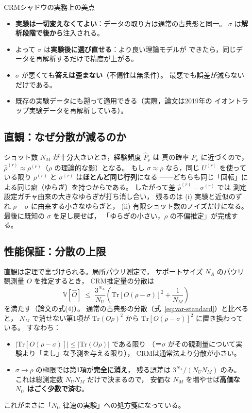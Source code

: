 \documentclass[11pt]{ltjsarticle}
\newcommand{\Tr}{\mathrm{Tr}}
\newcommand{\Var}{\mathbb{V}}
\newcommand{\NU}{N_U}
\newcommand{\NM}{N_M}
\begin{document}
\begin{pointbox}{CRMシャドウの実務上の美点}
\begin{itemize}
  \item \textbf{実験は一切変えなくてよい}：データの取り方は通常の古典影と同一。
        $\sigma$ は\textbf{解析段階で後から}注入される。
  \item よって $\sigma$ は\textbf{実験後に選び直せる}：より良い理論モデルが
        できたら，同じデータを再解析するだけで精度が上がる。
  \item $\sigma$ が悪くても\textbf{答えは歪まない}（不偏性は無条件）。
        最悪でも誤差が減らないだけである。
  \item 既存の実験データにも遡って適用できる（実際，論文は2019年の
        イオントラップ実験データを再解析している）。
\end{itemize}
\end{pointbox}

\subsection{直観：なぜ分散が減るのか}

ショット数 $\NM$ が十分大きいとき，経験頻度 $\hat P_\rho$ は
真の確率 $P_\rho$ に近づくので，
$\hat\rho^{(r)} \approx \rho^{(r)}$（$\rho$ の理論的な影）となる。
もし $\sigma \approx \rho$ なら，同じ $U^{(r)}$ を使っている限り
$\rho^{(r)}$ と $\sigma^{(r)}$ は\textbf{ほとんど同じ行列}になる
――どちらも同じ「回転」による同じ癖（ゆらぎ）を持つからである。
したがって差 $\hat\rho^{(r)} - \sigma^{(r)}$ では
測定設定ガチャ由来の大きなゆらぎが打ち消し合い，
残るのは (i) 実験と近似のずれ $\rho - \sigma$ に由来する小さなゆらぎと，
(ii) 有限ショット数のノイズだけになる。
最後に既知の $\sigma$ を足し戻せば，
「ゆらぎの小さい，$\rho$ の不偏推定」が完成する。

\subsection{性能保証：分散の上限}

直観は定理で裏づけられる。局所パウリ測定で，
サポートサイズ $N_A$ のパウリ観測量 $O$ を推定するとき，
CRM推定量の分散は
\begin{equation}
  \Var[\hat O] \;\leq\; \frac{3^{N_A}}{\NU}
  \left( \Tr\!\left[O(\rho - \sigma)\right]^2 + \frac{1}{\NM} \right)
  \label{eq:var-crm}
\end{equation}
を満たす（論文の式(4)）。
通常の古典影の分散（式~\eqref{eq:var-standard}）と比べると，
$\NM$ で消せない第1項が
$\Tr(O\rho)^2$ から $\Tr[O(\rho-\sigma)]^2$ に置き換わっている。
すなわち：
\begin{itemize}
  \item $|\Tr[O(\rho - \sigma)]| \leq |\Tr(O\rho)|$ である限り
        （＝$\sigma$ がその観測量について実験より「まし」な予測を与える限り），
        CRMは通常法より分散が小さい。
  \item $\sigma \to \rho$ の極限では第1項が\textbf{完全に消え}，
        残る誤差は $3^{N_A}/(\NU\NM)$ のみ。
        これは総測定数 $\NU\NM$ だけで決まるので，
        安価な $\NM$ を増やせば\textbf{高価な $\NU$ はごく少数で済む}。
\end{itemize}
これがまさに「$\NU$ 律速の実験」への処方箋になっている。
\end{document}
